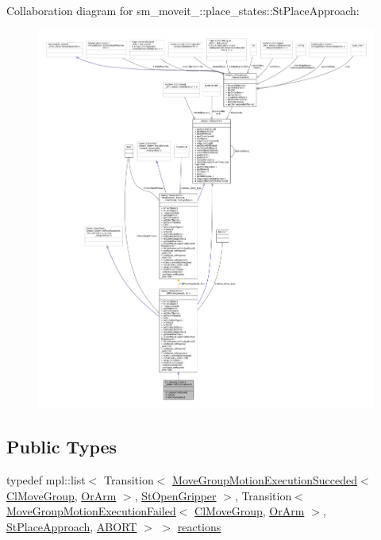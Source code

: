 Collaboration diagram for sm\+\_\+moveit\+\_\+:\+:place\+\_\+states\+:\+:St\+Place\+Approach\+:
\nopagebreak
\begin{figure}[H]
\begin{center}
\leavevmode
\includegraphics[width=350pt]{structsm__moveit__2_1_1place__states_1_1StPlaceApproach__coll__graph}
\end{center}
\end{figure}
\subsection*{Public Types}
\begin{DoxyCompactItemize}
\item 
typedef mpl\+::list$<$ Transition$<$ \hyperlink{structmove__group__interface__client_1_1MoveGroupMotionExecutionSucceded}{Move\+Group\+Motion\+Execution\+Succeded}$<$ \hyperlink{classmove__group__interface__client_1_1ClMoveGroup}{Cl\+Move\+Group}, \hyperlink{classsm__moveit__2_1_1OrArm}{Or\+Arm} $>$, \hyperlink{structsm__moveit__2_1_1place__states_1_1StOpenGripper}{St\+Open\+Gripper} $>$, Transition$<$ \hyperlink{structmove__group__interface__client_1_1MoveGroupMotionExecutionFailed}{Move\+Group\+Motion\+Execution\+Failed}$<$ \hyperlink{classmove__group__interface__client_1_1ClMoveGroup}{Cl\+Move\+Group}, \hyperlink{classsm__moveit__2_1_1OrArm}{Or\+Arm} $>$, \hyperlink{structsm__moveit__2_1_1place__states_1_1StPlaceApproach}{St\+Place\+Approach}, \hyperlink{classABORT}{A\+B\+O\+RT} $>$ $>$ \hyperlink{structsm__moveit__2_1_1place__states_1_1StPlaceApproach_a30e3124b28e5f312fed5eddad2486915}{reactions}
\end{DoxyCompactItemize}

